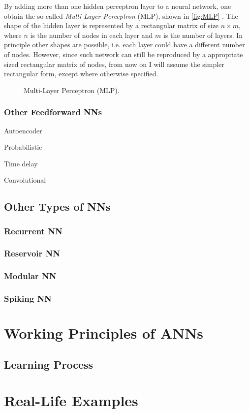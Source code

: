 By adding more than one hidden perceptron layer to a neural network, one obtain the so called \textit{Multi-Layer Perceptron} (MLP), shown in \autoref{fig:MLP} .
The shape of the hidden layer is represented by a rectangular matrix of size $n\times m$, where $n$ is the number of nodes in each layer and $m$ is the number of layers.
In principle other shapes are possible, i.e. each layer could have a different number of nodes.
However, since such network can still be reproduced by a appropriate sized rectangular matrix of nodes, from now on I will assume the simpler rectangular form, except where otherwise specified.

\begin{figure}[ht]
	\centering
	
	\caption{	Multi-Layer Perceptron (MLP).}
	\label{fig:MLP}
\end{figure}

\subsubsection{Other Feedforward NNs}
\label{sssec:Other_Feedforward_NNs}

Autoencoder

Probabilistic

Time delay

Convolutional

\subsection{Other Types of NNs}
\label{ssec:Other_Types_of_NNs}
\subsubsection{Recurrent NN}
\subsubsection{Reservoir NN}
\subsubsection{Modular NN}
\subsubsection{Spiking NN}

\section{Working Principles of ANNs}
\label{sec:Working_Principles_of_ANNs}

\subsection{Learning Process}
\label{ssec:Learning_Process}

\section{Real-Life Examples}
\label{sec:Real-Life_Examples}